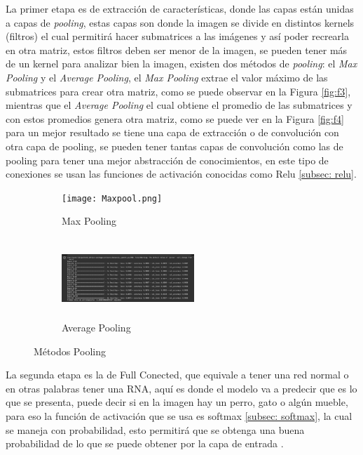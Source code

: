            La primer etapa es de extracci\'on de características, donde las capas están unidas a capas de \textit{pooling}, estas capas son 
            donde la imagen se divide en distintos kernels (filtros) el cual permitirá hacer submatrices a las imágenes y así poder recrearla
            en otra matriz, estos filtros deben ser menor de la imagen, se pueden tener m\'as de un kernel para
            analizar bien la imagen, existen dos m\'etodos de \textit{pooling}: el \textit{Max Pooling} y el \textit{Average Pooling},
             el \textit{Max Pooling} extrae el valor m\'aximo de las submatrices para crear otra matriz, como se puede observar en la 
            Figura \eqref{fig:f3}, mientras que el \textit{Average Pooling} el cual obtiene el promedio de las submatrices y con 
            estos promedios genera otra matriz, como se puede ver en la Figura \eqref{fig:f4} para un mejor resultado se tiene una capa de extracci\'on 
            o de convoluci\'on con otra capa de pooling, se pueden tener tantas capas de convoluci\'on como las de pooling 
            para tener una mejor abstracci\'on de conocimientos, en este tipo de conexiones se usan las funciones de activaci\'on conocidas como Relu \eqref{subsec: relu}. 

            \begin{figure}[H]
                \begin{subfigure}[H]{0.49\textwidth}
                    \texttt{[image: Maxpool.png]}
                    \caption{Max Pooling}
                    \label{fig:f3}
                \end{subfigure}
                \hfill
                \begin{subfigure}[H]{0.49\textwidth}
                    \includegraphics[width=5cm, height=3cm]{averagePooling.png}
                    \caption{Average Pooling}
                    \label{fig:f4}
                \end{subfigure}
                \caption{M\'etodos Pooling}
            \end{figure}

            La segunda etapa es la de Full Conected, que equivale a tener una red normal o en otras palabras tener una RNA, aqu\'i 
            es donde el modelo va a predecir que es lo que se presenta, puede decir si en la imagen hay un perro, gato o alg\'un mueble, 
            para eso la funci\'on de activaci\'on que se usa es softmax \eqref{subsec: softmax}, la cual se maneja con probabilidad, esto
            permitirá que se obtenga una buena probabilidad de lo que se puede obtener por la capa de entrada \cite{duran2017,Ortiz2020}.\\

